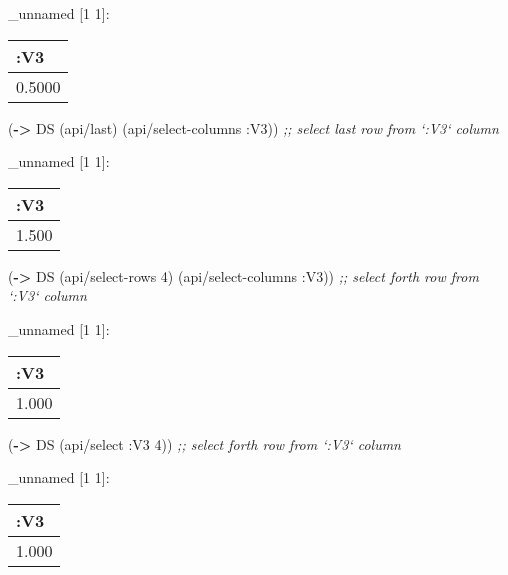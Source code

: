 \documentclass[]{article}
\newenvironment{Shaded}{\begin{snugshade}}{\end{snugshade}}
\newcommand{\KeywordTok}[1]{\textcolor[rgb]{0.13,0.29,0.53}{\textbf{#1}}}
\newcommand{\DecValTok}[1]{\textcolor[rgb]{0.00,0.00,0.81}{#1}}
\newcommand{\CommentTok}[1]{\textcolor[rgb]{0.56,0.35,0.01}{\textit{#1}}}
\newcommand{\AttributeTok}[1]{\textcolor[rgb]{0.77,0.63,0.00}{#1}}
\newcommand{\NormalTok}[1]{#1}
\begin{document}
\_unnamed {[}1 1{]}:

\begin{longtable}[]{@{}l@{}}
\toprule
:V3\tabularnewline
\midrule
\endhead
0.5000\tabularnewline
\bottomrule
\end{longtable}

\begin{Shaded}
\begin{Highlighting}[]
\NormalTok{(}\KeywordTok{->}\NormalTok{ DS}
\NormalTok{    (api/last)}
\NormalTok{    (api/select-columns }\AttributeTok{:V3}\NormalTok{)) }\CommentTok{;; select last row from `:V3` column}
\end{Highlighting}
\end{Shaded}

\_unnamed {[}1 1{]}:

\begin{longtable}[]{@{}l@{}}
\toprule
:V3\tabularnewline
\midrule
\endhead
1.500\tabularnewline
\bottomrule
\end{longtable}

\begin{Shaded}
\begin{Highlighting}[]
\NormalTok{(}\KeywordTok{->}\NormalTok{ DS}
\NormalTok{    (api/select-rows }\DecValTok{4}\NormalTok{)}
\NormalTok{    (api/select-columns }\AttributeTok{:V3}\NormalTok{)) }\CommentTok{;; select forth row from `:V3` column}
\end{Highlighting}
\end{Shaded}

\_unnamed {[}1 1{]}:

\begin{longtable}[]{@{}l@{}}
\toprule
:V3\tabularnewline
\midrule
\endhead
1.000\tabularnewline
\bottomrule
\end{longtable}

\begin{Shaded}
\begin{Highlighting}[]
\NormalTok{(}\KeywordTok{->}\NormalTok{ DS}
\NormalTok{    (api/select }\AttributeTok{:V3} \DecValTok{4}\NormalTok{)) }\CommentTok{;; select forth row from `:V3` column}
\end{Highlighting}
\end{Shaded}

\_unnamed {[}1 1{]}:

\begin{longtable}[]{@{}l@{}}
\toprule
:V3\tabularnewline
\midrule
\endhead
1.000\tabularnewline
\bottomrule
\end{longtable}
\end{document}
